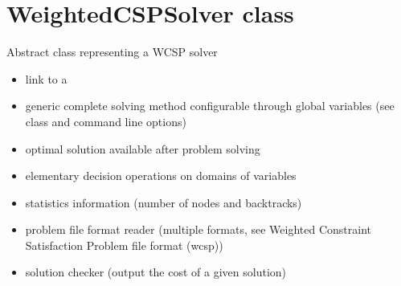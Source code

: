 \documentclass[letterpaper,10pt,openany,oneside,english]{sphinxmanual}
\begin{document}
\chapter{WeightedCSPSolver class}
\label{\detokenize{ref/ref_cpp:weightedcspsolver-class}}

\begin{fulllineitems}
\label{\detokenize{ref/ref_cpp:_CPPv417WeightedCSPSolver}}\label{\detokenize{ref/ref_cpp:_CPPv317WeightedCSPSolver}}\label{\detokenize{ref/ref_cpp:_CPPv217WeightedCSPSolver}}\label{\detokenize{ref/ref_cpp:WeightedCSPSolver}}
\pysigstartsignatures
\pysigstartmultiline
{}
\pysigstopmultiline
\pysigstopsignatures
\sphinxAtStartPar
Abstract class {\hyperref[\detokenize{ref/ref_cpp:classWeightedCSPSolver}]{}} representing a WCSP solver\begin{itemize}
\item {} 
\sphinxAtStartPar
link to a {\hyperref[\detokenize{ref/ref_cpp:classWeightedCSP}]{}}

\item {} 
\sphinxAtStartPar
generic complete solving method configurable through global variables (see {\hyperref[\detokenize{ref/ref_cpp:classToulBar2}]{}} class and command line options)

\item {} 
\sphinxAtStartPar
optimal solution available after problem solving

\item {} 
\sphinxAtStartPar
elementary decision operations on domains of variables

\item {} 
\sphinxAtStartPar
statistics information (number of nodes and backtracks)

\item {} 
\sphinxAtStartPar
problem file format reader (multiple formats, see Weighted Constraint Satisfaction Problem file format (wcsp))

\item {} 
\sphinxAtStartPar
solution checker (output the cost of a given solution) 


\end{itemize}
\end{fulllineitems}
\end{document}
